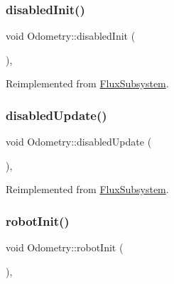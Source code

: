 \mbox{\label{classOdometry_a0df3b0180a8fa5a01a9e441de112140e}} 
\subsubsection{\texorpdfstring{disabled\+Init()}{disabledInit()}}
{\footnotesize\ttfamily void Odometry\+::disabled\+Init (\begin{DoxyParamCaption}{ }\end{DoxyParamCaption})\hspace{0.3cm}{\ttfamily [override]}, {\ttfamily [virtual]}}



Reimplemented from \hyperlink{classFluxSubsystem_aa0b8fde8aa5094627d15d24e545e1da4}{Flux\+Subsystem}.

\mbox{\label{classOdometry_aef83c6c62c8e992b20759aec705c2ee8}} 
\subsubsection{\texorpdfstring{disabled\+Update()}{disabledUpdate()}}
{\footnotesize\ttfamily void Odometry\+::disabled\+Update (\begin{DoxyParamCaption}{ }\end{DoxyParamCaption})\hspace{0.3cm}{\ttfamily [override]}, {\ttfamily [virtual]}}



Reimplemented from \hyperlink{classFluxSubsystem_a5c39cb0f0834cc77a2b8f4f47778da87}{Flux\+Subsystem}.

\mbox{\label{classOdometry_a84379c5878ad6dd502297e6f956298f9}} 
\subsubsection{\texorpdfstring{robot\+Init()}{robotInit()}}
{\footnotesize\ttfamily void Odometry\+::robot\+Init (\begin{DoxyParamCaption}{ }\end{DoxyParamCaption})\hspace{0.3cm}{\ttfamily [override]}, {\ttfamily [virtual]}}



